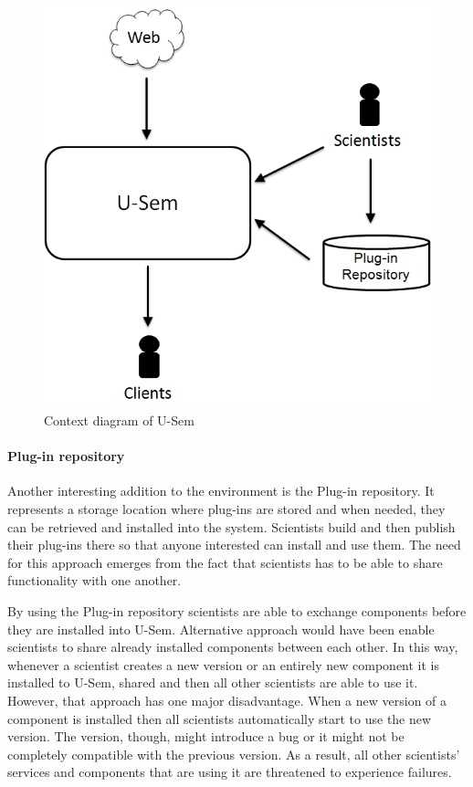 \begin{figure}[h!]
  \centering
  	\includegraphics[scale=0.5]{plug-in/environment/runtime_env.png}
  \caption{Context diagram of U-Sem }
  \label{fig_context}
\end{figure}

\paragraph{Plug-in repository}
Another interesting addition to the environment is the Plug-in repository. It represents a storage location where plug-ins are stored and when needed, they can be retrieved and installed into the system. Scientists build and then publish their plug-ins there so that anyone interested can install and use them. The need for this approach emerges from the fact that scientists has to be able to share functionality with one another.

By using the Plug-in repository scientists are able to exchange components before they are installed into U-Sem. Alternative approach would have been enable scientists to share already installed components between each other. In this way, whenever a scientist creates a new version or an entirely new component it is installed to U-Sem, shared and then all other scientists are able to use it. However, that approach has one major disadvantage. When a new version of a component is installed then all scientists automatically start to use the new version. The version, though, might introduce a bug or it might not be completely compatible with the previous version. As a result, all other scientists' services and components that are using it are threatened to experience failures. 

